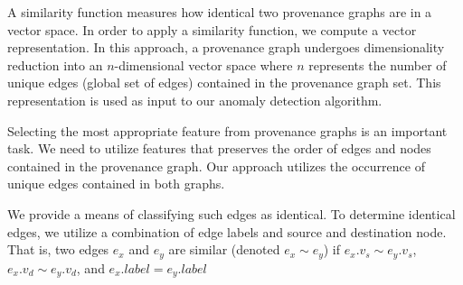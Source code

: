 A similarity function measures how identical two provenance graphs are in a vector space. In order to apply a similarity function, we compute a vector representation. In this approach, a provenance graph undergoes dimensionality reduction into an $n$-dimensional vector space where $n$ represents the number of unique edges (global set of edges) contained in the provenance graph set. This representation is used as input to our anomaly detection algorithm. \par Selecting the most appropriate feature from provenance graphs is an important task. We need to utilize features that preserves the order of edges and nodes contained in the provenance graph. Our approach utilizes the occurrence of unique edges contained in both graphs.  

\par We provide a means of classifying such edges as identical. To determine identical edges, we utilize a combination of edge labels and source and destination node. That is, two edges $e_x $ and $e_y$ are similar (denoted $e_x \sim e_y$) if $e_x.v_s \sim e_y.v_s$, $e_x.v_d \sim e_y.v_d$, and $e_x.label = e_y.label$  



%
%
%
%
%
 





